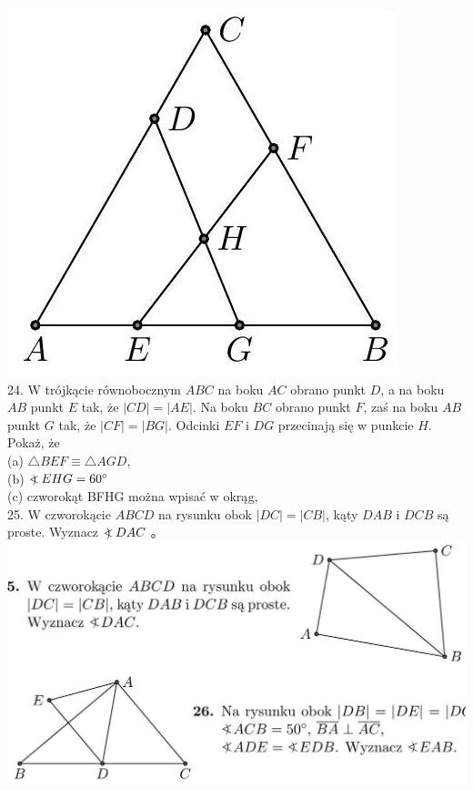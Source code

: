 \documentclass[10pt]{article}
\newcommand\Varangle{\mathop{{<\!\!\!\!\!\text{\small)}}\:}\nolimits}
\begin{document}
\includegraphics[max width=\textwidth, center]{2024_11_21_71f62bd117d375398909g-202}\\
24. W trójkącie równobocznym \(A B C\) na boku \(A C\) obrano punkt \(D\), a na boku \(A B\) punkt \(E\) tak, że \(|C D|=|A E|\). Na boku \(B C\) obrano punkt \(F\), zaś na boku \(A B\) punkt \(G\) tak, że \(|C F|=|B G|\). Odcinki \(E F\) i \(D G\) przecinają się w punkcie \(H\). Pokaż, że\\
(a) \(\triangle B E F \equiv \triangle A G D\),\\
(b) \(\Varangle E H G=60^{\circ}\)\\
(c) czworokąt BFHG można wpisać w okrąg,\\
25. W czworokącie \(A B C D\) na rysunku obok \(|D C|=|C B|\), kąty \(D A B\) i \(D C B\) są proste. Wyznacz \(\Varangle D A C\) 。\\
\includegraphics[max width=\textwidth, center]{2024_11_21_71f62bd117d375398909g-202(1)}\\
\end{document}
